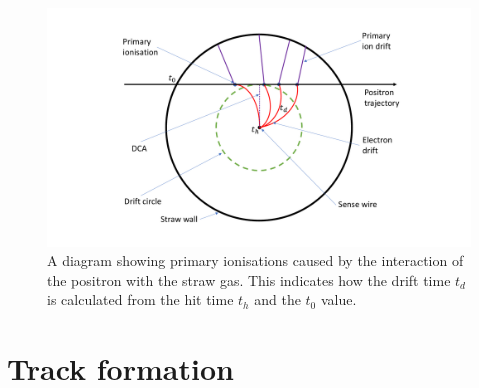 \begin{figure}[th]
\centering
\includegraphics[scale=0.5]{Figures/driftstraw.pdf}
\decoRule
\caption{A diagram showing primary ionisations caused by the interaction of the positron with the straw gas.  This indicates how the drift time $t_{d}$ is calculated from the hit time $t_{h}$ and the $t_{0}$ value.}
\label{fig:driftstraw}
\end{figure}

\section{Track formation}

